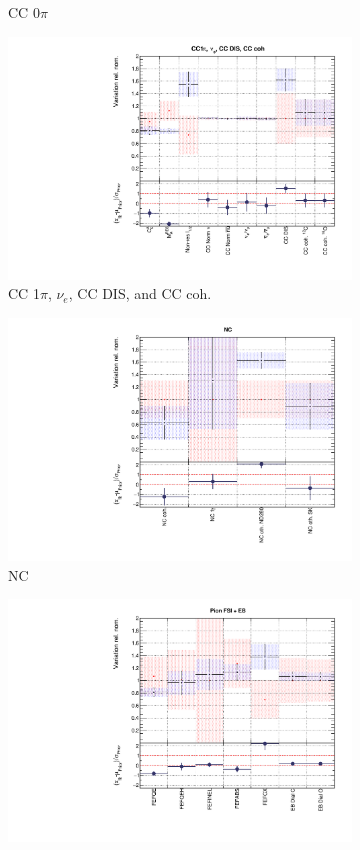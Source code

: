 \begin{figure}[t]
\begin{subfigure}{0.49\textwidth}
  \caption{CC 0$\pi$}
\end{subfigure}
\begin{subfigure}{0.49\textwidth}
  \centering
  \includegraphics[width=0.95\linewidth]{figs/rhcmpdatxsec248_2}
  \caption{CC 1$\pi$, $\nu_e$, CC DIS, and CC coh.}
\end{subfigure}
\begin{subfigure}{0.49\textwidth}
  \centering
  \includegraphics[width=0.95\linewidth]{figs/rhcmpdatxsec248_3}
  \caption{NC}
\end{subfigure}
\begin{subfigure}{0.49\textwidth}
  \centering
  \includegraphics[width=0.95\linewidth]{figs/rhcmpdatxsec248_4}

\end{subfigure}
\end{figure}
